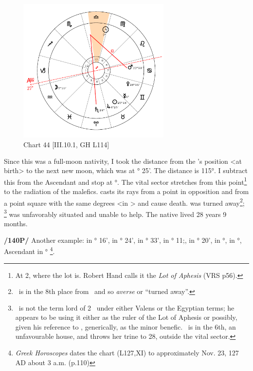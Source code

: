 \clearpage
\begin{figure}
\centering
\vspace{-20pt}
\includegraphics[width=0.68\textwidth]{charts/3_10_1}
\caption{Chart 44 [III.10.1, GH L114]}
\label{fig:chart44}
\end{figure} 

Since this was a full-moon nativity, I took the distance from the \Moon’s position <at birth> to the next new moon, which was at \Gemini\xspace 2° 25'. The distance is 115°. I subtract this from the Ascendant and stop at \Libra\xspace 2°. The vital sector stretches from this point\footnote{At 2\Libra, where the lot is. Robert Hand calls it the \textsl{Lot of Aphesis} (VRS p56).} to the radiation of the malefics. \Saturn\xspace casts its rays from a point in opposition and \Mars\xspace from a point square with the same degrees <in \Libra> and cause death. \Jupiter\xspace was turned away\footnote{\Jupiter\, is in the 8th place from \Libra\, and so \textsl{averse} or ``turned away''.}; \Venus\,\footnote{\Venus\, is not the term lord of 2 \Libra\, under either Valens or the Egyptian terms; he appears to be using it either as the ruler of the Lot of Aphesis or possibly, given his reference to \Jupiter, generically, as the minor benefic. \Venus\, is in the 6th, an unfavourable house, and throws her trine to 28\Libra, outside the vital sector.} was unfavorably situated and unable to help. The native lived 28 years 9 months.

\newpage
\textbf{/140P/} Another example: \Sun\xspace in \Sagittarius\xspace 12° 16', \Moon\xspace in \Sagittarius\xspace 17° 24', \Saturn\xspace in \Libra\xspace 11° 33', \Jupiter\xspace in \Gemini\xspace 19° 11;, \Mars\xspace in \Scorpio\xspace 4° 20', \Venus\xspace in \Libra\xspace 26°, \Mercury\xspace in \Scorpio\xspace 27°,
Ascendant in \Libra\xspace 20°
\footnote{\textit{Greek Horoscopes} dates the chart (L127,XI) to approximately Nov. 23, 127 AD about 3 a.m. (p.110)}.

